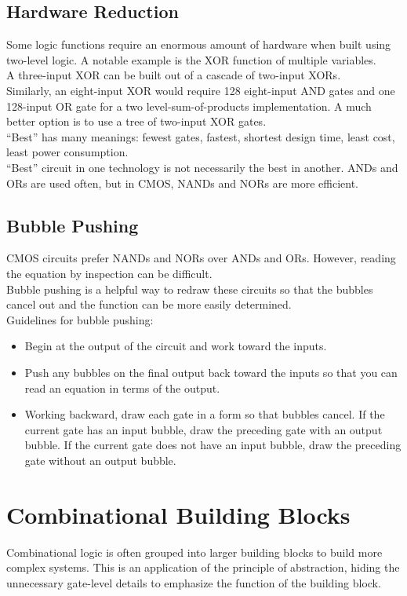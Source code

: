 \documentclass[12pt]{article}
\theoremstyle{definition}
\begin{document}
  \subsection{Hardware Reduction}
  Some logic functions require an enormous amount of hardware when built using two-level logic.
  A notable example is the XOR function of multiple variables. \\
  A three-input XOR can be built out of a cascade of two-input XORs. \\
  Similarly, an eight-input XOR would require 128 eight-input AND gates and one 128-input OR gate for a two level-sum-of-products implementation. A much better option is to use a tree of two-input XOR gates. \\

  ``Best'' has many meanings: fewest gates, fastest, shortest design time, least cost, least power consumption. \\
  ``Best'' circuit in one technology is not necessarily the best in another.
  ANDs and ORs are used often, but in CMOS, NANDs and NORs are more efficient.

  \subsection{Bubble Pushing}
  CMOS circuits prefer NANDs and NORs over ANDs and ORs.
  However, reading the equation by inspection can be difficult. \\
  Bubble pushing is a helpful way to redraw these circuits so that the bubbles cancel out and the function can be more easily determined. \\
  Guidelines for bubble pushing:
  \begin{itemize}
    \item Begin at the output of the circuit and work toward the inputs.
    \item Push any bubbles on the final output back toward the inputs so that you can read an equation in terms of the output.
    \item Working backward, draw each gate in a form so that bubbles cancel. If the current gate has an input bubble, draw the preceding gate with an output bubble. If the current gate does not have an input bubble, draw the preceding gate without an output bubble.
  \end{itemize}

  \section{Combinational Building Blocks}
  Combinational logic is often grouped into larger building blocks to build more complex systems.
  This is an application of the principle of abstraction, hiding the unnecessary gate-level details to emphasize the function of the building block.
\end{document}
